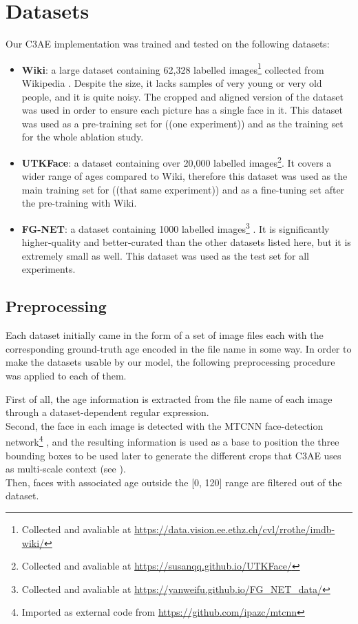 
\chapter{Datasets}

Our C3AE implementation was trained and tested on the following datasets:

\begin{itemize}
  \item \textbf{Wiki}:
    a large dataset containing 62,328 labelled
    images\footnote{Collected and avaliable at \url{https://data.vision.ee.ethz.ch/cvl/rrothe/imdb-wiki/}}
    collected from Wikipedia \cite{wiki}.
    Despite the size, it lacks samples of very young
    or very old people, and it is quite noisy.
    The cropped and aligned version of the dataset
    was used in order to ensure each picture has a single face in it.
    This dataset was used as a pre-training set for ((one experiment))
    and as the training set for the whole ablation study.
  \item \textbf{UTKFace}:
    a dataset containing over 20,000 labelled
    images\footnote{Collected and avaliable at \url{https://susanqq.github.io/UTKFace/}}.
    It covers a wider range of ages compared to Wiki,
    therefore this dataset was used as the main training set
    for ((that same experiment)) and as a fine-tuning set after
    the pre-training with Wiki.
  \item \textbf{FG-NET}:
    a dataset containing 1000 labelled
    images\footnote{Collected and avaliable at \url{https://yanweifu.github.io/FG_NET_data/}}
    \cite{fgnet}.
    It is significantly higher-quality and better-curated than the other
    datasets listed here, but it is extremely small as well.
    This dataset was used as the test set for all experiments.
\end{itemize}

\section{Preprocessing}
Each dataset initially came in the form of a set of image files each with the
corresponding ground-truth age encoded in the file name in some way.
In order to make the datasets usable by our model, the following
preprocessing procedure was applied to each of them.

First of all, the age information is extracted from the file name of each
image through a dataset-dependent regular expression. \\
Second, the face in each image is detected with the MTCNN face-detection
network\footnote{Imported as external code from \url{https://github.com/ipazc/mtcnn}}
\cite{mtcnn}, and the resulting information is used as a base to position
the three bounding boxes to be used later to generate the different crops
that C3AE uses as multi-scale context (see ). \\
Then, faces with associated age outside the [0, 120] range are filtered
out of the dataset.

